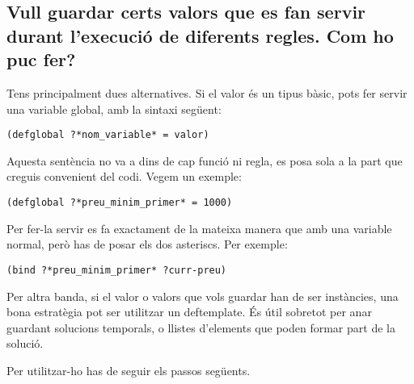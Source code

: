 \documentclass[11pt,svgnames]{scrbook}
\begin{document}
\subsection{Vull guardar certs valors que es fan servir durant l'execució de diferents regles. Com ho puc fer?}

Tens principalment dues alternatives. Si el valor és un tipus bàsic, pots fer servir una variable global, amb la sintaxi següent:
\medskip

\texttt{(defglobal ?*nom\_variable* = valor)}
\medskip


Aquesta sentència no va a dins de cap funció ni regla, es posa sola a la part que creguis convenient del codi.
Vegem un exemple:
\medskip

\texttt{(defglobal ?*preu\_minim\_primer* = 1000)}
\medskip


Per fer-la servir es fa exactament de la mateixa manera que amb una variable normal, però has de posar els dos asteriscs. Per exemple:
\medskip

\texttt{(bind ?*preu\_minim\_primer* ?curr-preu)}
\medskip

Per altra banda, si el valor o valors que vols guardar han de ser instàncies, una bona estratègia pot ser utilitzar un deftemplate. És útil sobretot per anar guardant solucions temporals, o llistes d'elements que poden formar part de la solució.

Per utilitzar-ho has de seguir els passos següents.
\end{document}
